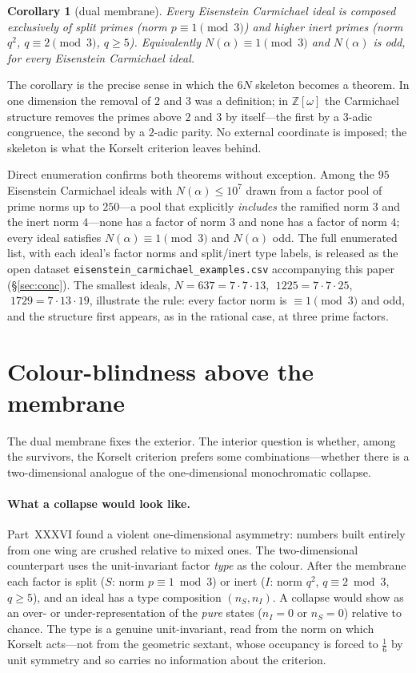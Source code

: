 \documentclass[11pt]{article}
\newtheorem{corollary}{Corollary}
\begin{document}
\begin{corollary}[dual membrane]\label{cor:dual}
Every Eisenstein Carmichael ideal is composed exclusively of split primes (norm $p\equiv1\pmod3$) and
higher inert primes (norm $q^2$, $q\equiv2\pmod3$, $q\ge5$). Equivalently $N(\alpha)\equiv1\pmod3$ and
$N(\alpha)$ is odd, for every Eisenstein Carmichael ideal.
\end{corollary}

The corollary is the precise sense in which the $6N$ skeleton becomes a theorem. In one dimension the
removal of $2$ and $3$ was a definition; in $\mathbb{Z}[\omega]$ the Carmichael structure removes the
primes above $2$ and $3$ by itself---the first by a $3$-adic congruence, the second by a $2$-adic
parity. No external coordinate is imposed; the skeleton is what the Korselt criterion leaves behind.

Direct enumeration confirms both theorems without exception. Among the $95$ Eisenstein Carmichael
ideals with $N(\alpha)\le10^7$ drawn from a factor pool of prime norms up to $250$---a pool that
explicitly \emph{includes} the ramified norm $3$ and the inert norm $4$---none has a factor of norm $3$
and none has a factor of norm $4$; every ideal satisfies $N(\alpha)\equiv1\pmod3$ and $N(\alpha)$ odd.
The full enumerated list, with each ideal's factor norms and split/inert type labels, is released as
the open dataset \texttt{eisenstein\_carmichael\_examples.csv} accompanying this paper (\S\ref{sec:conc}).
The smallest ideals, $N=637=7\cdot7\cdot13$, $\;1225=7\cdot7\cdot25$, $\;1729=7\cdot13\cdot19$,
illustrate the rule: every factor norm is $\equiv1\pmod3$ and odd, and the structure first appears, as
in the rational case, at three prime factors.

\section{Colour-blindness above the membrane}\label{sec:cb}
The dual membrane fixes the exterior. The interior question is whether, among the survivors, the
Korselt criterion prefers some combinations---whether there is a two-dimensional analogue of the
one-dimensional monochromatic collapse.

\paragraph{What a collapse would look like.}
Part~XXXVI found a violent one-dimensional asymmetry: numbers built entirely from one wing are crushed
relative to mixed ones. The two-dimensional counterpart uses the unit-invariant factor \emph{type} as
the colour. After the membrane each factor is split ($S$: norm $p\equiv1\bmod3$) or inert ($I$: norm
$q^2$, $q\equiv2\bmod3$, $q\ge5$), and an ideal has a type composition $(n_S,n_I)$. A collapse would
show as an over- or under-representation of the \emph{pure} states ($n_I=0$ or $n_S=0$) relative to
chance. The type is a genuine unit-invariant, read from the norm on which Korselt acts---not from the
geometric sextant, whose occupancy is forced to $\tfrac16$ by unit symmetry and so carries no
information about the criterion.
\end{document}
